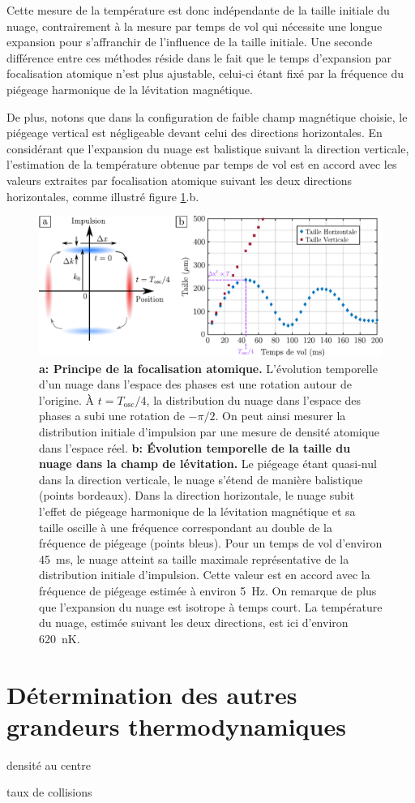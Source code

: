 Cette mesure de la température est donc indépendante de la taille initiale du nuage, contrairement à la mesure par temps de vol qui nécessite une longue expansion pour s'affranchir de l'influence de la taille initiale. Une seconde différence entre ces méthodes réside dans le fait que le temps d'expansion par focalisation atomique n'est plus ajustable, celui-ci étant fixé par la fréquence du piégeage harmonique de la lévitation magnétique. 

De plus, notons que dans la configuration de faible champ magnétique choisie, le piégeage vertical est négligeable devant celui des directions horizontales. En considérant que l'expansion du nuage est balistique suivant la direction verticale, l'estimation de la température obtenue par temps de vol est en accord avec les valeurs extraites par focalisation atomique suivant les deux directions horizontales, comme illustré figure \ref{fig:focalisation_atomique}.b.

\begin{figure}
\centering
\includegraphics[width=\textwidth]{Fig/Modif_exp/focalisation_atomique.pdf}
\caption{\textbf{a: Principe de la focalisation atomique.} L'évolution temporelle d'un nuage dans l'espace des phases est une rotation autour de l'origine. À $t=T_{\mathrm{osc}}/4$, la distribution du nuage dans l'espace des phases a subi une rotation de $-\pi/2$. On peut ainsi mesurer la distribution initiale d'impulsion par une mesure de densité atomique dans l'espace réel. \textbf{b: Évolution temporelle de la taille du nuage dans la champ de lévitation.} Le piégeage étant quasi-nul dans la direction verticale, le nuage s'étend de manière balistique (points bordeaux). Dans la direction horizontale, le nuage subit l'effet de piégeage harmonique de la lévitation magnétique et sa taille oscille à une fréquence correspondant au double de la fréquence de piégeage (points bleus). Pour un temps de vol d'environ \SI{45}{\milli\second}, le nuage atteint sa taille maximale représentative de la distribution initiale d'impulsion. Cette valeur est en accord avec la fréquence de piégeage estimée à environ \SI{5}{\hertz}. On remarque de plus que l'expansion du nuage est isotrope à temps court. La température du nuage, estimée suivant les deux directions, est ici d'environ \SI{620}{\nano\kelvin}.}
\label{fig:focalisation_atomique}
\end{figure}


\section{Détermination des autres grandeurs thermodynamiques}
densité au centre

taux de collisions

